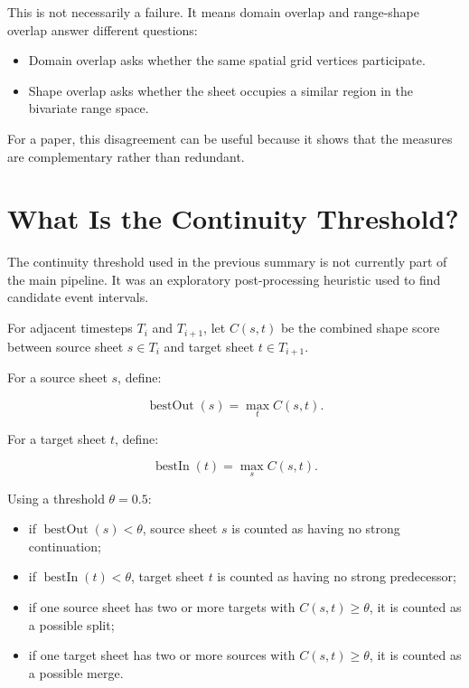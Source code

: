 \documentclass[11pt]{article}
\begin{document}
This is not necessarily a failure. It means domain overlap and range-shape
overlap answer different questions:

\begin{itemize}[leftmargin=*]
\item Domain overlap asks whether the same spatial grid vertices participate.
\item Shape overlap asks whether the sheet occupies a similar region in the
  bivariate range space.
\end{itemize}

For a paper, this disagreement can be useful because it shows that the measures
are complementary rather than redundant.

\section{What Is the Continuity Threshold?}

The continuity threshold used in the previous summary is not currently part of
the main pipeline. It was an exploratory post-processing heuristic used to find
candidate event intervals.

For adjacent timesteps \(T_i\) and \(T_{i+1}\), let \(C(s,t)\) be the combined
shape score between source sheet \(s \in T_i\) and target sheet \(t \in
T_{i+1}\).

For a source sheet \(s\), define:

\[
\operatorname{bestOut}(s) = \max_t C(s,t).
\]

For a target sheet \(t\), define:

\[
\operatorname{bestIn}(t) = \max_s C(s,t).
\]

Using a threshold \(\theta = 0.5\):

\begin{itemize}[leftmargin=*]
\item if \(\operatorname{bestOut}(s) < \theta\), source sheet \(s\) is counted
  as having no strong continuation;
\item if \(\operatorname{bestIn}(t) < \theta\), target sheet \(t\) is counted
  as having no strong predecessor;
\item if one source sheet has two or more targets with \(C(s,t) \ge \theta\),
  it is counted as a possible split;
\item if one target sheet has two or more sources with \(C(s,t) \ge \theta\),
  it is counted as a possible merge.
\end{itemize}
\end{document}
